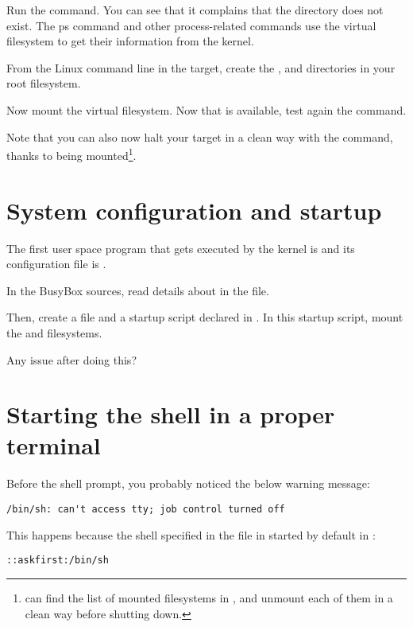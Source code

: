 Run the  command. You can see that it complains that the
 directory does not exist. The ps command and other
process-related commands use the  virtual filesystem to get
their information from the kernel.

From the Linux command line in the target, create the ,
 and  directories in your root filesystem.

Now mount the  virtual filesystem. Now that  is
available, test again the  command.

Note that you can also now halt your target in a clean way with the 
command, thanks to  being mounted\footnote{
can find the list of mounted filesystems in , and
unmount each of them in a clean way before shutting down.}.

\section{System configuration and startup}

The first user space program that gets executed by the kernel is
 and its configuration file is .

In the BusyBox sources, read details about  in the
 file.

Then, create a  file and a 
startup script declared in . In this startup
script, mount the  and  filesystems.

Any issue after doing this?

\section{Starting the shell in a proper terminal}

Before the shell prompt, you probably noticed the below warning message:

\begin{verbatim}
/bin/sh: can't access tty; job control turned off
\end{verbatim}

This happens because the shell specified in the  file
in started by default in :

\begin{verbatim}
::askfirst:/bin/sh
\end{verbatim}

